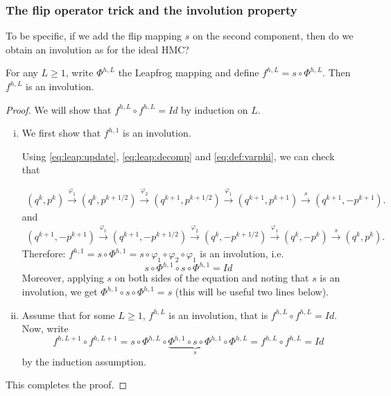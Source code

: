 \documentclass[english,graybox,envcountchap,envcountsame,sectrefs,shortlabels]{svmono}
\theoremstyle{style}
\begin{document}
\subsubsection{The flip operator trick and the involution property}
To be specific, if we add the flip mapping $s$ on the second component, then do we obtain an involution as for the ideal HMC?


\begin{lemma}
For any $L\geq 1$, write $\Phi^{h,L}$ the Leapfrog mapping and define $f^{h,L}=s\circ \Phi^{h,L}$.
Then $f^{h,L}$ is an involution.
\end{lemma}



\begin{proof}
We will show that $f^{h,L} \circ f^{h,L}=Id$ by induction on $L$.

\begin{enumerate}[(i)]
\item We first show that $f^{h,1}$ is an involution.

Using \eqref{eq:leap:update}, \eqref{eq:leap:decomp} and \eqref{eq:def:varphi}, we can check that

\begin{align*}
(q^k,p^k) \stackrel{\varphi_1}{\longrightarrow} (q^k,p^{k+1/2}) \stackrel{\varphi_2}{\longrightarrow} (q^{k+1},p^{k+1/2}) \stackrel{\varphi_1}{\longrightarrow} (q^{k+1},p^{k+1}) \stackrel{s}{\longrightarrow} (q^{k+1},-p^{k+1}).
\end{align*}
and
\begin{align*}
(q^{k+1},-p^{k+1}) \stackrel{\varphi_1}{\longrightarrow} (q^{k+1},-p^{k+1/2}) \stackrel{\varphi_2}{\longrightarrow} (q^{k},-p^{k+1/2}) \stackrel{\varphi_1}{\longrightarrow} (q^{k},-p^{k}) \stackrel{s}{\longrightarrow} (q^{k},p^{k}).
\end{align*}
Therefore: $f^{h,1}=s\circ \Phi^{h,1}=s \circ \varphi_1 \circ \varphi_2 \circ \varphi_1$ is an involution, i.e.
$$
s\circ \Phi^{h,1} \circ s\circ \Phi^{h,1}=Id
$$
Moreover, applying $s$ on both sides of the equation and noting that $s$ is an involution, we get $\Phi^{h,1} \circ s\circ \Phi^{h,1}=s$ (this will be useful two lines below).
\item Assume that for some $L\geq 1$, $f^{h,L}$ is an involution, that is $f^{h,L} \circ f^{h,L}=Id$. Now, write
$$
f^{h,L+1} \circ f^{h,L+1}=s\circ \Phi^{h,L} \circ \underbrace{\Phi^{h,1} \circ s \circ \Phi^{h,1}}_{s} \circ \Phi^{h,L} =f^{h,L} \circ f^{h,L}=Id
$$
by the induction assumption.
\end{enumerate}
This completes the proof.
\end{proof}
\end{document}
